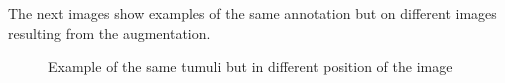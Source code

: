 The next images show examples of the same annotation but on different images resulting from the augmentation.

\begin{figure}[H]
    \centering
    \qquad
    \caption{Example of the same tumuli but in different position of the image}%
\end{figure}

